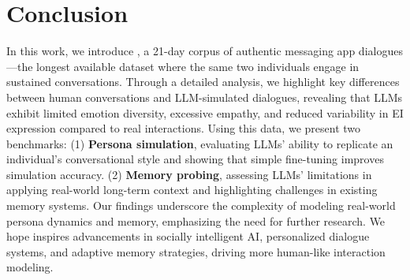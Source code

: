 \section{Conclusion}  
In this work, we introduce \dataset{}, a 21-day corpus of authentic messaging app dialogues—the longest available dataset where the same two individuals engage in sustained conversations. 
Through a detailed analysis, we highlight key differences between human conversations and LLM-simulated dialogues, revealing that LLMs exhibit limited emotion diversity, excessive empathy, and reduced variability in EI expression compared to real interactions.
Using this data, we present two benchmarks:  
(1) \textbf{Persona simulation}, evaluating LLMs' ability to replicate an individual’s conversational style and showing that simple fine-tuning improves simulation accuracy.  
(2) \textbf{Memory probing}, assessing LLMs' limitations in applying real-world long-term context and highlighting challenges in existing memory systems.  
Our findings underscore the complexity of modeling real-world persona dynamics and memory, emphasizing the need for further research.  
We hope \dataset{} inspires advancements in socially intelligent AI, personalized dialogue systems, and adaptive memory strategies, driving more human-like interaction modeling.  